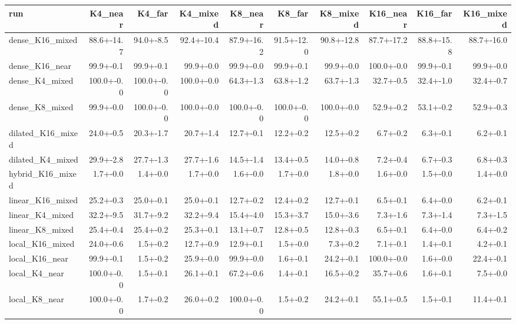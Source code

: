\begin{tabular}{lrrrrrrrrr}
\toprule
run & K4\_near & K4\_far & K4\_mixed & K8\_near & K8\_far & K8\_mixed & K16\_near & K16\_far & K16\_mixed \\
\midrule
dense\_K16\_mixed & 88.6+-14.7 & 94.0+-8.5 & 92.4+-10.4 & 87.9+-16.2 & 91.5+-12.0 & 90.8+-12.8 & 87.7+-17.2 & 88.8+-15.8 & 88.7+-16.0 \\
dense\_K16\_near & 99.9+-0.1 & 99.9+-0.1 & 99.9+-0.0 & 99.9+-0.0 & 99.9+-0.1 & 99.9+-0.0 & 100.0+-0.0 & 99.9+-0.1 & 99.9+-0.0 \\
dense\_K4\_mixed & 100.0+-0.0 & 100.0+-0.0 & 100.0+-0.0 & 64.3+-1.3 & 63.8+-1.2 & 63.7+-1.3 & 32.7+-0.5 & 32.4+-1.0 & 32.4+-0.7 \\
dense\_K8\_mixed & 99.9+-0.0 & 100.0+-0.0 & 100.0+-0.0 & 100.0+-0.0 & 100.0+-0.0 & 100.0+-0.0 & 52.9+-0.2 & 53.1+-0.2 & 52.9+-0.3 \\
dilated\_K16\_mixed & 24.0+-0.5 & 20.3+-1.7 & 20.7+-1.4 & 12.7+-0.1 & 12.2+-0.2 & 12.5+-0.2 & 6.7+-0.2 & 6.3+-0.1 & 6.2+-0.1 \\
dilated\_K4\_mixed & 29.9+-2.8 & 27.7+-1.3 & 27.7+-1.6 & 14.5+-1.4 & 13.4+-0.5 & 14.0+-0.8 & 7.2+-0.4 & 6.7+-0.3 & 6.8+-0.3 \\
hybrid\_K16\_mixed & 1.7+-0.0 & 1.4+-0.0 & 1.7+-0.0 & 1.6+-0.0 & 1.7+-0.0 & 1.8+-0.0 & 1.6+-0.0 & 1.5+-0.0 & 1.4+-0.0 \\
linear\_K16\_mixed & 25.2+-0.3 & 25.0+-0.1 & 25.0+-0.1 & 12.7+-0.2 & 12.4+-0.2 & 12.7+-0.1 & 6.5+-0.1 & 6.4+-0.0 & 6.2+-0.1 \\
linear\_K4\_mixed & 32.2+-9.5 & 31.7+-9.2 & 32.2+-9.4 & 15.4+-4.0 & 15.3+-3.7 & 15.0+-3.6 & 7.3+-1.6 & 7.3+-1.4 & 7.3+-1.5 \\
linear\_K8\_mixed & 25.4+-0.4 & 25.4+-0.2 & 25.3+-0.1 & 13.1+-0.7 & 12.8+-0.5 & 12.8+-0.3 & 6.5+-0.1 & 6.4+-0.0 & 6.4+-0.2 \\
local\_K16\_mixed & 24.0+-0.6 & 1.5+-0.2 & 12.7+-0.9 & 12.9+-0.1 & 1.5+-0.0 & 7.3+-0.2 & 7.1+-0.1 & 1.4+-0.1 & 4.2+-0.1 \\
local\_K16\_near & 99.9+-0.1 & 1.5+-0.2 & 25.9+-0.0 & 99.9+-0.0 & 1.6+-0.1 & 24.2+-0.1 & 100.0+-0.0 & 1.6+-0.0 & 22.4+-0.1 \\
local\_K4\_near & 100.0+-0.0 & 1.5+-0.1 & 26.1+-0.1 & 67.2+-0.6 & 1.4+-0.1 & 16.5+-0.2 & 35.7+-0.6 & 1.6+-0.1 & 7.5+-0.0 \\
local\_K8\_near & 100.0+-0.0 & 1.7+-0.2 & 26.0+-0.2 & 100.0+-0.0 & 1.5+-0.2 & 24.2+-0.1 & 55.1+-0.5 & 1.5+-0.1 & 11.4+-0.1 \\
\bottomrule
\end{tabular}
